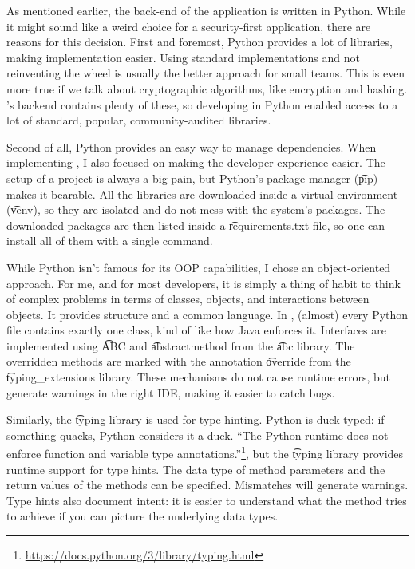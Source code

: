 As mentioned earlier, the back-end of the application is written in Python.
While it might sound like a weird choice for a security-first application, there are reasons for this decision.
First and foremost, Python provides a lot of libraries, making implementation easier.
Using standard implementations and not reinventing the wheel is usually the better approach for small teams.
This is even more true if we talk about cryptographic algorithms, like encryption and hashing.
\app{}'s backend contains plenty of these, so developing in Python enabled access to a lot of standard, popular, community-audited libraries.

Second of all, Python provides an easy way to manage dependencies.
When implementing \app{}, I also focused on making the developer experience easier.
The setup of a project is always a big pain, but Python's package manager (\t{pip}) makes it bearable.
All the libraries are downloaded inside a virtual environment (\t{venv}), so they are isolated and do not mess with the system's packages.
The downloaded packages are then listed inside a \t{requirements.txt} file, so one can install all of them with a single command.

While Python isn't famous for its OOP capabilities, I chose an object-oriented approach.
For me, and for most developers, it is simply a thing of habit to think of complex problems in terms of classes, objects, and interactions between objects.
It provides structure and a common language.
In \app{}, (almost) every Python file contains exactly one class, kind of like how Java enforces it.
Interfaces are implemented using \t{ABC} and \t{abstractmethod} from the \t{abc} library.
The overridden methods are marked with the annotation \t{override} from the \t{typing\_extensions} library.
These mechanisms do not cause runtime errors, but generate warnings in the right IDE, making it easier to catch bugs.

Similarly, the \t{typing} library is used for type hinting.
Python is duck-typed: if something quacks, Python considers it a duck.
``The Python runtime does not enforce function and variable type annotations.''\footnote{\url{https://docs.python.org/3/library/typing.html}}, but the \t{typing} library provides runtime support for type hints.
The data type of method parameters and the return values of the methods can be specified. 
Mismatches will generate warnings.
Type hints also document intent: it is easier to understand what the method tries to achieve if you can picture the underlying data types.

